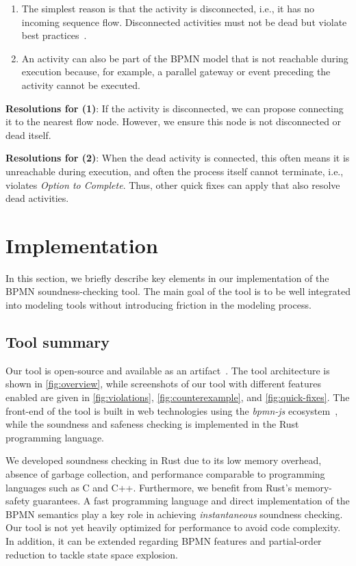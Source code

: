 \documentclass[runningheads]{llncs}
\begin{document}
\begin{enumerate}
	\item The simplest reason is that the activity is disconnected, i.e., it has no incoming sequence flow.
	Disconnected activities must not be dead but violate best practices~\cite{camundaservicesgmbhBpmnlint2024}.
	\item An activity can also be part of the BPMN model that is not reachable during execution because, for example, a parallel gateway or event preceding the activity cannot be executed.
\end{enumerate}

\textbf{Resolutions for (1)}: If the activity is disconnected, we can propose connecting it to the nearest flow node.
However, we ensure this node is not disconnected or dead itself.

\textbf{Resolutions for (2)}: When the dead activity is connected, this often means it is unreachable during execution, and often the process itself cannot terminate, i.e., violates \textit{Option to Complete}.
Thus, other quick fixes can apply that also resolve dead activities.

\section{Implementation}

In this section, we briefly describe key elements in our implementation of the BPMN soundness-checking tool.
The main goal of the tool is to be well integrated into modeling tools without introducing friction in the modeling process.

\subsection{Tool summary}
Our tool is open-source and available as an artifact~\cite{noauthorgivenBPM2024Artifacts2024}.
The tool architecture is shown in \autoref{fig:overview}, while screenshots of our tool with different features enabled are given in \autoref{fig:violations}, \autoref{fig:counterexample}, and \autoref{fig:quick-fixes}.
The front-end of the tool is built in web technologies using the \textit{bpmn-js} ecosystem~\cite{camundaservicesgmbhBpmnjsTokenSimulation2024}, while the soundness and safeness checking is implemented in the Rust programming language.

We developed soundness checking in Rust due to its low memory overhead, absence of garbage collection, and performance comparable to programming languages such as C and C++.
Furthermore, we benefit from Rust's memory-safety guarantees.
A fast programming language and direct implementation of the BPMN semantics play a key role in achieving \textit{instantaneous} soundness checking.
Our tool is not yet heavily optimized for performance to avoid code complexity.
In addition, it can be extended regarding BPMN features and partial-order reduction to tackle state space explosion.
\end{document}
